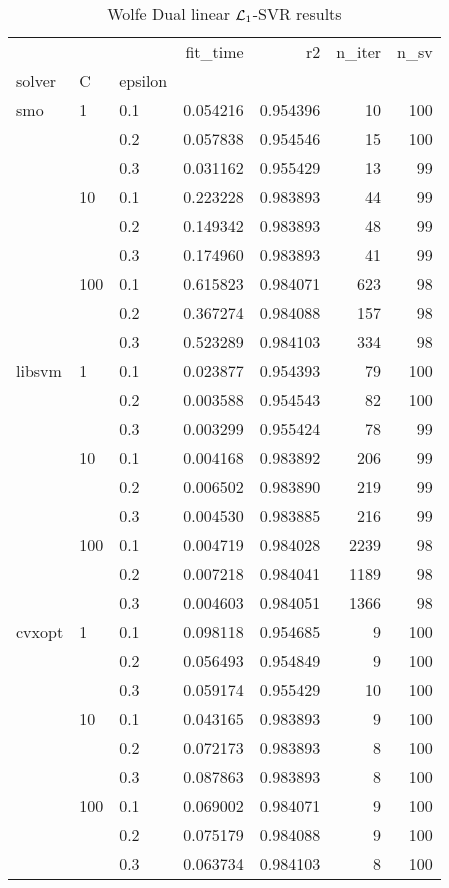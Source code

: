 \begin{table}[H]
\centering
\caption{Wolfe Dual linear $\protect \mathcal{L}_1$-SVR results}
\label{linear_dual_l1_svr_cv_results}
\begin{tabular}{lllrrrr}
\toprule
       &     &     &  fit\_time &        r2 &  n\_iter &  n\_sv \\
solver & C & epsilon &           &           &         &       \\
\midrule
smo & 1   & 0.1 &  0.054216 &  0.954396 &      10 &   100 \\
       &     & 0.2 &  0.057838 &  0.954546 &      15 &   100 \\
       &     & 0.3 &  0.031162 &  0.955429 &      13 &    99 \\
       & 10  & 0.1 &  0.223228 &  0.983893 &      44 &    99 \\
       &     & 0.2 &  0.149342 &  0.983893 &      48 &    99 \\
       &     & 0.3 &  0.174960 &  0.983893 &      41 &    99 \\
       & 100 & 0.1 &  0.615823 &  0.984071 &     623 &    98 \\
       &     & 0.2 &  0.367274 &  0.984088 &     157 &    98 \\
       &     & 0.3 &  0.523289 &  0.984103 &     334 &    98 \\
libsvm & 1   & 0.1 &  0.023877 &  0.954393 &      79 &   100 \\
       &     & 0.2 &  0.003588 &  0.954543 &      82 &   100 \\
       &     & 0.3 &  0.003299 &  0.955424 &      78 &    99 \\
       & 10  & 0.1 &  0.004168 &  0.983892 &     206 &    99 \\
       &     & 0.2 &  0.006502 &  0.983890 &     219 &    99 \\
       &     & 0.3 &  0.004530 &  0.983885 &     216 &    99 \\
       & 100 & 0.1 &  0.004719 &  0.984028 &    2239 &    98 \\
       &     & 0.2 &  0.007218 &  0.984041 &    1189 &    98 \\
       &     & 0.3 &  0.004603 &  0.984051 &    1366 &    98 \\
cvxopt & 1   & 0.1 &  0.098118 &  0.954685 &       9 &   100 \\
       &     & 0.2 &  0.056493 &  0.954849 &       9 &   100 \\
       &     & 0.3 &  0.059174 &  0.955429 &      10 &   100 \\
       & 10  & 0.1 &  0.043165 &  0.983893 &       9 &   100 \\
       &     & 0.2 &  0.072173 &  0.983893 &       8 &   100 \\
       &     & 0.3 &  0.087863 &  0.983893 &       8 &   100 \\
       & 100 & 0.1 &  0.069002 &  0.984071 &       9 &   100 \\
       &     & 0.2 &  0.075179 &  0.984088 &       9 &   100 \\
       &     & 0.3 &  0.063734 &  0.984103 &       8 &   100 \\
\bottomrule
\end{tabular}
\end{table}
